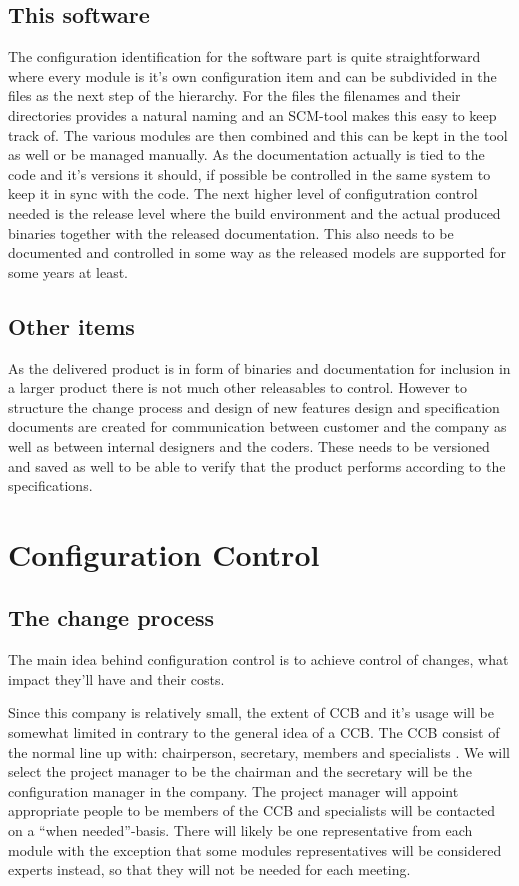 \documentclass[a4paper,11pt]{article}
\begin{document}
\subsection{This software}

The configuration identification for the software part is quite straightforward where every module is it's own configuration item and can be subdivided in the files as the next step of the hierarchy.
For the files the filenames and their directories provides a natural naming and an SCM-tool makes this easy to keep track of. The various modules are then combined and this can be kept in the tool as well or be managed manually.
As the documentation actually is tied to the code and it's versions it should, if possible be controlled in the same system to keep it in sync with the code.
The next higher level of configutration control needed is the release level where the build environment and the actual produced binaries together with the released documentation.
This also needs to be documented and controlled in some way as the released models are supported for some years at least.


\subsection{Other items}

As the delivered product is in form of binaries and documentation for inclusion in a larger product there is not much other releasables to control.
However to structure the change process and design of new features design and specification documents are created for communication between customer and the company as well as between internal designers and the coders. These needs to be versioned and saved as well to be able to verify that the product performs according to the specifications.

\section{Configuration Control}

\subsection{The change process}
The main idea behind configuration control is to achieve control of changes, what impact they'll have and their costs.

Since this company is relatively small, the extent of CCB and it's usage will be somewhat limited in contrary to the general idea of a CCB.
The CCB consist of the normal line up with: chairperson, secretary, members and specialists \cite{daniels}. We will select the project manager
to be the chairman and the secretary will be the configuration manager in the company. The project manager will appoint appropriate people to be
members of the CCB and specialists will be contacted on a ``when needed''-basis. There will likely be one representative from each module with the exception
that some modules representatives will be considered experts instead, so that they will not be needed for each meeting.
\end{document}
